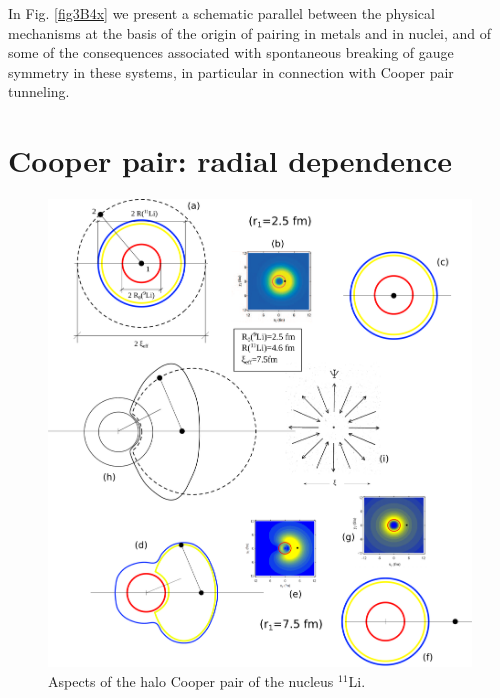 \begin{subappendices}



In Fig. \ref{fig3B4x} we present a schematic parallel between the physical mechanisms at the basis of the origin of pairing in metals and in nuclei, and of some of the consequences associated with spontaneous breaking of gauge symmetry in these systems, in particular in connection with Cooper pair tunneling.  
\section{Cooper pair: radial dependence}\label{App3B}
  \begin{figure}
  	\centerline{\includegraphics*[width=15cm,angle=0	]{nutshell/figs/Fig3B1}}
  	\caption{Aspects of the halo Cooper pair of the nucleus $^{11}$Li.}\label{fig3B1}
  \end{figure}

\end{subappendices}
